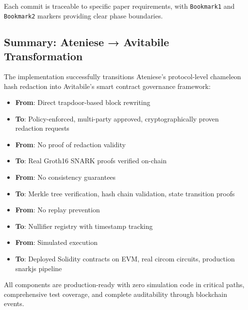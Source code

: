Each commit is traceable to specific paper requirements, with \texttt{Bookmark1} and \texttt{Bookmark2} markers providing clear phase boundaries.

\subsection{Summary: Ateniese → Avitabile Transformation}

The implementation successfully transitions Ateniese's protocol-level chameleon hash redaction into Avitabile's smart contract governance framework:

\begin{itemize}
    \item \textbf{From}: Direct trapdoor-based block rewriting
    \item \textbf{To}: Policy-enforced, multi-party approved, cryptographically proven redaction requests
    
    \item \textbf{From}: No proof of redaction validity
    \item \textbf{To}: Real Groth16 SNARK proofs verified on-chain
    
    \item \textbf{From}: No consistency guarantees
    \item \textbf{To}: Merkle tree verification, hash chain validation, state transition proofs
    
    \item \textbf{From}: No replay prevention
    \item \textbf{To}: Nullifier registry with timestamp tracking
    
    \item \textbf{From}: Simulated execution
    \item \textbf{To}: Deployed Solidity contracts on EVM, real circom circuits, production snarkjs pipeline
\end{itemize}

All components are production-ready with zero simulation code in critical paths, comprehensive test coverage, and complete auditability through blockchain events.
